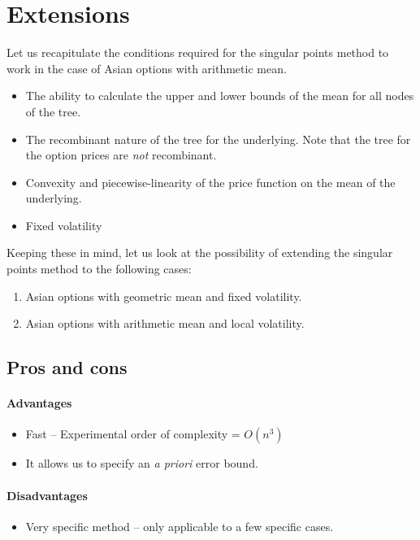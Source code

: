 \section{Extensions}
\label{sec:extensions}

Let us recapitulate the conditions required for the singular points method to work in the case of Asian options with arithmetic mean.
\begin{itemize}
\item The ability to calculate the upper and lower bounds of the mean for all nodes of the tree.
\item The recombinant nature of the tree for the underlying. Note that the tree for the option prices are \emph{not} recombinant.
\item Convexity and piecewise-linearity of the price function on the mean of the underlying.
\item Fixed volatility
\end{itemize}

Keeping these in mind, let us look at the possibility of extending the singular points method to the following cases:
\begin{enumerate}
\item Asian options with geometric mean and fixed volatility.
\item Asian options with arithmetic mean and local volatility.
\end{enumerate}


\subsection{Pros and cons}
\label{sec:sp-adv}

\paragraph{Advantages}
\begin{itemize}
\item Fast -- Experimental order of complexity = $ O(n^3) $
\item It allows us to specify an \emph{a priori} error bound.
\end{itemize}


\paragraph{Disadvantages}
\begin{itemize}
\item Very specific method -- only applicable to a few specific cases.
\end{itemize}


